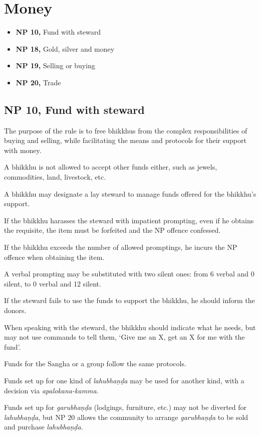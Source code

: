 \chapter{Money}

\begin{itemize}
\tightlist
\item
  \textbf{NP 10,} Fund with steward
\item
  \textbf{NP 18,} Gold, silver and money
\item
  \textbf{NP 19,} Selling or buying
\item
  \textbf{NP 20,} Trade
\end{itemize}

\section{NP 10, Fund with steward}

The purpose of the rule is to free bhikkhus from the complex
responsibilities of buying and selling, while facilitating the means and
protocols for their support with money.

A bhikkhu is not allowed to accept other funds either, such as jewels,
commodities, land, livestock, etc.

A bhikkhu may designate a lay steward to manage funds offered for the
bhikkhu's support.

If the bhikkhu harasses the steward with impatient prompting, even if he
obtains the requisite, the item must be forfeited and the NP offence
confessed.

If the bhikkhu exceeds the number of allowed promptings, he incurs the
NP offence when obtaining the item.

A verbal prompting may be substituted with two silent ones: from 6
verbal and 0 silent, to 0 verbal and 12 silent.

If the steward fails to use the funds to support the bhikkhu, he should
inform the donors.

When speaking with the steward, the bhikkhu should indicate what he
needs, but may not use commands to tell them, `Give me an X, get an X
for me with the fund'.

Funds for the Sangha or a group follow the same protocols.

Funds set up for one kind of \emph{lahubhaṇḍa} may be used for another
kind, with a decision via \emph{apalokana-kamma}.

Funds set up for \emph{garubhaṇḍa} (lodgings, furniture, etc.) may not
be diverted for \emph{lahubhaṇḍa}, but NP 20 allows the community to
arrange \emph{garubhaṇḍa} to be sold and purchase \emph{lahubhaṇḍa}.

